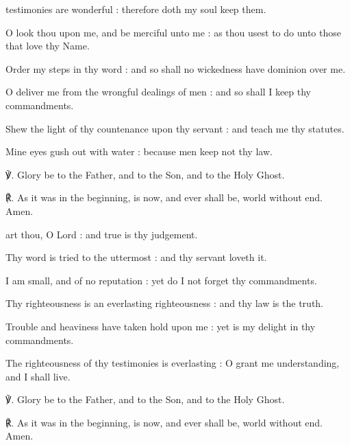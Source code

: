 \begin{multicols}{2}
 testimonies are wonderful : therefore doth my soul keep them.\par
{}
O look thou upon me, and be merciful unto me : as thou usest to do unto those that love thy Name.\par
{}Order my steps in thy word : and so shall no wickedness have dominion over me.\par
{}O deliver me from the wrongful dealings of men : and so shall I keep thy commandments.\par
{}Shew the light of thy countenance upon thy servant : and teach me thy statutes.\par
{}Mine eyes gush out with water : because men keep not thy law.\par
℣. Glory be to the Father, and to the Son, and to the Holy Ghost.\par
℟. As it was in the beginning, is now, and ever shall be, world without end. Amen.

 art thou, O Lord : and true is thy judgement.\par
{}
Thy word is tried to the uttermost : and thy servant loveth it.\par
{}I am small, and of no reputation : yet do I not forget thy commandments.\par
{}Thy righteousness is an everlasting righteousness : and thy law is the truth.\par
{}Trouble and heaviness have taken hold upon me : yet is my delight in thy commandments.\par
{}The righteousness of thy testimonies is everlasting : O grant me understanding, and I shall live.\par
℣. Glory be to the Father, and to the Son, and to the Holy Ghost.\par
℟. As it was in the beginning, is now, and ever shall be, world without end. Amen.


\end{multicols}
